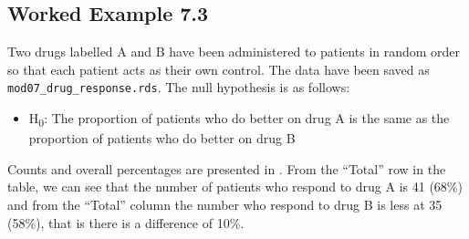 \documentclass[
  a4paper,
]{memoir}
\providecommand{\tightlist}{%
  \setlength{\itemsep}{0pt}\setlength{\parskip}{0pt}}
\begin{document}
\subsection{Worked Example 7.3}\label{worked-example-7.3}

Two drugs labelled A and B have been administered to patients in random
order so that each patient acts as their own control. The data have been
saved as \texttt{mod07\_drug\_response.rds}. The null hypothesis is as
follows:

\begin{itemize}
\tightlist
\item
  H\textsubscript{0}: The proportion of patients who do better on drug A
  is the same as the proportion of patients who do better on drug B
\end{itemize}

Counts and overall percentages are presented in . From the ``Total'' row
in the table, we can see that the number of patients who respond to drug
A is 41 (68\%) and from the ``Total'' column the number who respond to
drug B is less at 35 (58\%), that is there is a difference of 10\%.
\end{document}
